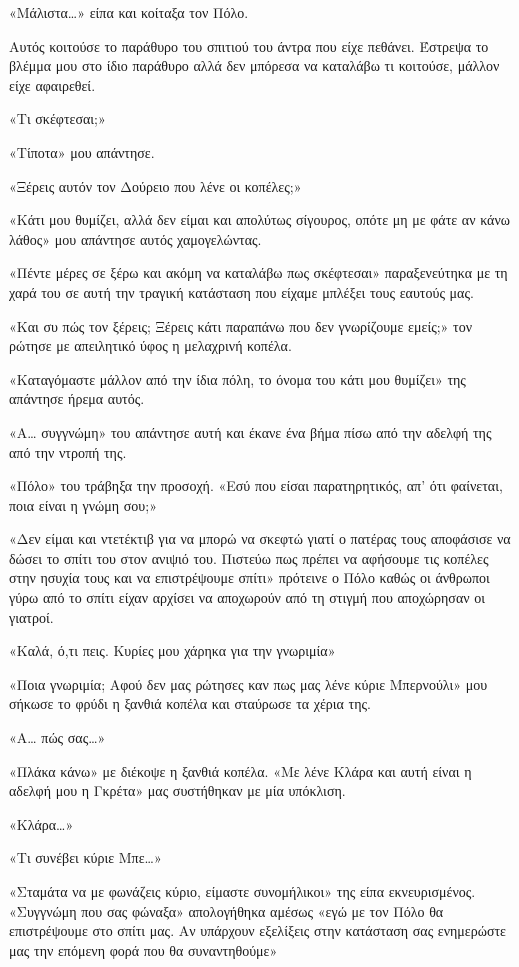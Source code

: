 \documentclass[12pt,twoside, openany]{book}
\begin{document}
«Μάλιστα…» είπα και κοίταξα τον Πόλο. 

Αυτός κοιτούσε το παράθυρο του σπιτιού του άντρα που είχε πεθάνει. Έστρεψα το βλέμμα μου στο ίδιο παράθυρο αλλά δεν μπόρεσα να καταλάβω τι κοιτούσε, μάλλον είχε αφαιρεθεί.

«Τι σκέφτεσαι;»

«Τίποτα» μου απάντησε.

«Ξέρεις αυτόν τον Δούρειο που λένε οι κοπέλες;»

«Κάτι μου θυμίζει, αλλά δεν είμαι και απολύτως σίγουρος, οπότε μη με φάτε αν κάνω λάθος» μου απάντησε αυτός χαμογελώντας.

«Πέντε μέρες σε ξέρω και ακόμη να καταλάβω πως σκέφτεσαι» παραξενεύτηκα με τη χαρά του σε αυτή την τραγική κατάσταση που είχαμε μπλέξει τους εαυτούς μας.

«Και συ πώς τον ξέρεις; Ξέρεις κάτι παραπάνω που δεν γνωρίζουμε εμείς;» τον ρώτησε με απειλητικό ύφος η μελαχρινή κοπέλα.

«Καταγόμαστε μάλλον από την ίδια πόλη, το όνομα του κάτι μου θυμίζει» της απάντησε ήρεμα αυτός.

«Α… συγγνώμη» του απάντησε αυτή και έκανε ένα βήμα πίσω από την αδελφή της από την ντροπή της.

«Πόλο» του τράβηξα την προσοχή. «Εσύ που είσαι παρατηρητικός, απ’ ότι φαίνεται, ποια είναι η γνώμη σου;»

«Δεν είμαι και ντετέκτιβ για να μπορώ να σκεφτώ γιατί ο πατέρας τους αποφάσισε να δώσει το σπίτι του στον ανιψιό του. Πιστεύω πως πρέπει να αφήσουμε τις κοπέλες στην ησυχία τους και να επιστρέψουμε σπίτι» πρότεινε ο Πόλο καθώς οι άνθρωποι γύρω από το σπίτι είχαν αρχίσει να αποχωρούν από τη στιγμή που αποχώρησαν οι γιατροί.

«Καλά, ό,τι πεις. Κυρίες μου χάρηκα για την γνωριμία» 

«Ποια γνωριμία; Αφού δεν μας ρώτησες καν πως μας λένε κύριε Μπερνούλι» μου σήκωσε το φρύδι η ξανθιά κοπέλα και σταύρωσε τα χέρια της.

«Α… πώς σας…»

«Πλάκα κάνω» με διέκοψε η ξανθιά κοπέλα. «Με λένε Κλάρα και αυτή είναι η αδελφή μου η Γκρέτα» μας συστήθηκαν με μία υπόκλιση.

«Κλάρα…»

«Τι συνέβει κύριε Μπε…»

«Σταμάτα να με φωνάζεις κύριο, είμαστε συνομήλικοι» της είπα εκνευρισμένος. «Συγγνώμη που σας φώναξα» απολογήθηκα αμέσως «εγώ με τον Πόλο θα επιστρέψουμε στο σπίτι μας. Αν υπάρχουν εξελίξεις στην κατάσταση σας ενημερώστε μας την επόμενη φορά που θα συναντηθούμε»
\end{document}
